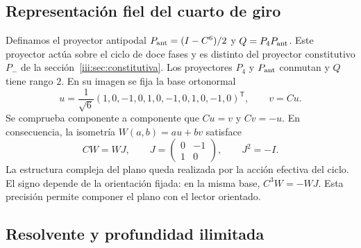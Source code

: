 \subsection{Representación fiel del cuarto de giro}

Definamos el proyector antipodal $P_{\rm ant}=(I-C^6)/2$ y
$Q=P_4P_{\rm ant}$. Este proyector actúa sobre el ciclo de doce fases y es
distinto del proyector constitutivo $P_-$ de la sección~\ref{iii:sec:constitutiva}.
Los proyectores $P_4$ y $P_{\rm ant}$ conmutan y
$Q$ tiene rango $2$. En su imagen se fija la base ortonormal
\begin{equation}
 u=\frac1{\sqrt6}(1,0,-1,0,1,0,-1,0,1,0,-1,0)^{\mathsf T},
 \qquad v=Cu.
 \label{iii:eq:uv}
\end{equation}
Se comprueba componente a componente que $Cu=v$ y $Cv=-u$. En consecuencia,
la isometría $W(a,b)=au+bv$ satisface
\begin{equation}
 CW=WJ,\qquad
 J=\begin{pmatrix}0&-1\\1&0\end{pmatrix},\qquad J^2=-I.
 \label{iii:eq:quarter-intertwiner}
\end{equation}
La estructura compleja del plano queda realizada por la acción efectiva del
ciclo. El signo depende de la orientación fijada: en la misma base,
$C^3W=-WJ$. Esta precisión permite componer el plano con el lector orientado.

\subsection{Resolvente y profundidad ilimitada}

